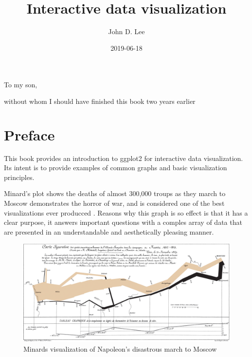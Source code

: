 \documentclass[]{krantz}
\title{Interactive data visualization}
\author{John D. Lee}
\date{2019-06-18}
\begin{document}
\maketitle


\thispagestyle{empty}

\begin{center}
To my son,

without whom I should have finished this book two years earlier
\end{center}

\setlength{\abovedisplayskip}{-5pt}
\setlength{\abovedisplayshortskip}{-5pt}

{
\hypersetup{linkcolor=}
\setcounter{tocdepth}{2}
\tableofcontents
}
\listoftables
\listoffigures
\hypertarget{preface}{%
\chapter*{Preface}\label{preface}}


This book provides an introduction to ggplot2 for interactive data visualization. Its intent is to provide examples of common graphs and basic visualization principles.

Minard's plot shows the deaths of almost 300,000 troups as they march to Moscow demonstrates the horror of war, and is considered one of the best visualizations ever producced \citep{Tufte1983}. Reasons why this graph is so effect is that it has a clear purpose, it answers important questions with a comples array of data that are presented in an understandable and aesthetically pleasing manner.

\begin{figure}
\includegraphics[width=27.82in]{images/Minard_timeline_map} \caption{Minards visualization of Napoleon's disastrous march to Moscow}\label{fig:minard}
\end{figure}
\end{document}
